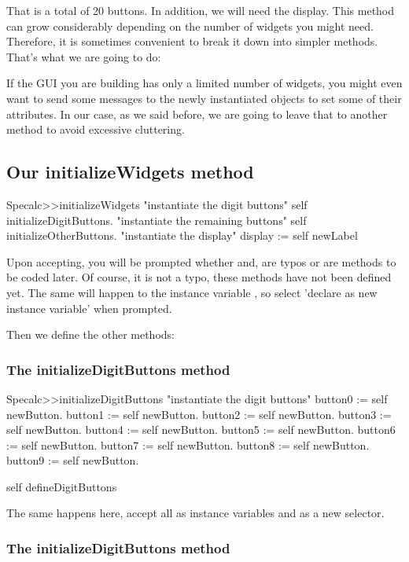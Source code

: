 \documentclass[a4paper,10pt,twoside]{book}
\begin{document}
That is a total of 20 buttons. In addition, we will need the display. 
This method can grow considerably depending on the number of widgets you might need. Therefore, it is sometimes convenient to break it down into simpler methods.
That's what we are going to do:

If the GUI you are building has only a limited number of widgets, you might even want to send some messages to the newly instantiated objects to set some of their attributes. In our case, as we said before, we are going to leave that to another method to avoid excessive cluttering.
\subsection{ Our initializeWidgets method}

\begin{code}{}
Specalc>>initializeWidgets 
	"instantiate the digit buttons"
	self initializeDigitButtons.
	"instantiate the remaining buttons"
	self initializeOtherButtons.
	"instantiate the display"
	display	:=	self newLabel
\end{code}


Upon accepting, you will be prompted whether  and,  are typos or are methods to be coded later. Of course, it is not a typo, these methods have not been defined yet. The same will happen to the instance variable , so select 'declare as new instance variable' when prompted. 

Then we define the other methods:
\subsubsection{ The initializeDigitButtons method}

\begin{code}{}
Specalc>>initializeDigitButtons
   "instantiate the digit buttons"
   button0 := self newButton.
   button1 := self newButton.
   button2 := self newButton.
   button3 := self newButton.
   button4 := self newButton.
   button5 := self newButton.
   button6 := self newButton.
   button7 := self newButton.
   button8 := self newButton.
   button9 := self newButton.

   self defineDigitButtons
\end{code}


The same happens here, accept all  as instance variables and  as a new selector.
\subsubsection{ The initializeDigitButtons method}
\end{document}
